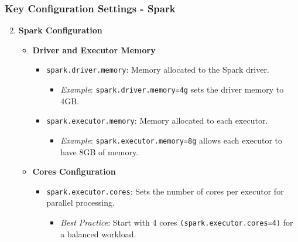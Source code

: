 \documentclass{beamer}
\begin{document}
\begin{frame}[fragile]
    \frametitle{Key Configuration Settings - Spark}
    \begin{enumerate}
        \setcounter{enumi}{1}
        \item \textbf{Spark Configuration}
        \begin{itemize}
            \item \textbf{Driver and Executor Memory}
            \begin{itemize}
                \item \texttt{spark.driver.memory}: Memory allocated to the Spark driver. 
                \begin{itemize}
                    \item \textit{Example}: \texttt{spark.driver.memory=4g} sets the driver memory to 4GB.
                \end{itemize}
                \item \texttt{spark.executor.memory}: Memory allocated to each executor.
                \begin{itemize}
                    \item \textit{Example}: \texttt{spark.executor.memory=8g} allows each executor to have 8GB of memory.
                \end{itemize}
            \end{itemize}
            \item \textbf{Cores Configuration}
            \begin{itemize}
                \item \texttt{spark.executor.cores}: Sets the number of cores per executor for parallel processing.
                \begin{itemize}
                    \item \textit{Best Practice}: Start with 4 cores \texttt{(spark.executor.cores=4)} for a balanced workload.
                \end{itemize}
            \end{itemize}
        \end{itemize}
    \end{enumerate}
\end{frame}
\end{document}
